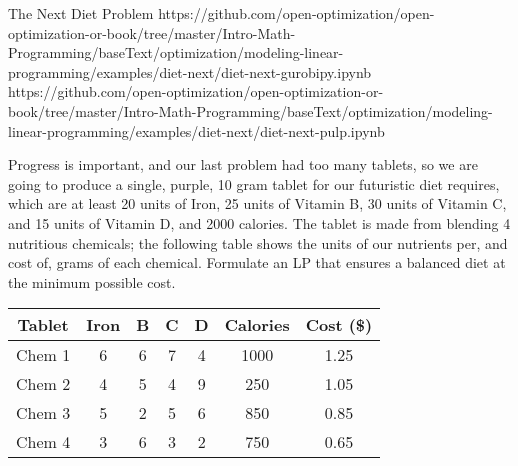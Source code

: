 \begin{examplewithallcode}{The Next Diet Problem}
    {}
    {https://github.com/open-optimization/open-optimization-or-book/tree/master/Intro-Math-Programming/baseText/optimization/modeling-linear-programming/examples/diet-next/diet-next-gurobipy.ipynb}
    {https://github.com/open-optimization/open-optimization-or-book/tree/master/Intro-Math-Programming/baseText/optimization/modeling-linear-programming/examples/diet-next/diet-next-pulp.ipynb}
    
    Progress is important, and our last problem had too many tablets, so we are going to produce a single, purple, 10 gram tablet for our futuristic diet requires, which are at least 20 units of Iron, 25 units of Vitamin B, 30 units of Vitamin C, and 15 units of Vitamin D, and 2000 calories. The tablet is made from blending 4 nutritious chemicals; the following table shows the units of our nutrients per, and cost of, grams of each chemical.
    Formulate an LP that ensures a balanced diet at the minimum possible cost.
    \end{examplewithallcode}
    
    \begin{table}[h!] \begin{center} \begin{tabular} {|c|c|c|c|c|c|c|}
    \hline Tablet  & Iron  &  B &  C &  D & Calories & Cost (\$) \\ \hline
    \hline  Chem 1  & 6    & 6         & 7         & 4         &  1000    & 1.25 \\
    \hline  Chem 2  & 4    & 5         & 4         & 9         &  250     & 1.05 \\
    \hline  Chem 3  & 5    & 2         & 5         & 6         &  850     & 0.85 \\
    \hline  Chem 4  & 3    & 6         & 3         & 2         &  750     & 0.65 \\
    \hline
    \end{tabular} \end{center} \end{table}
    
